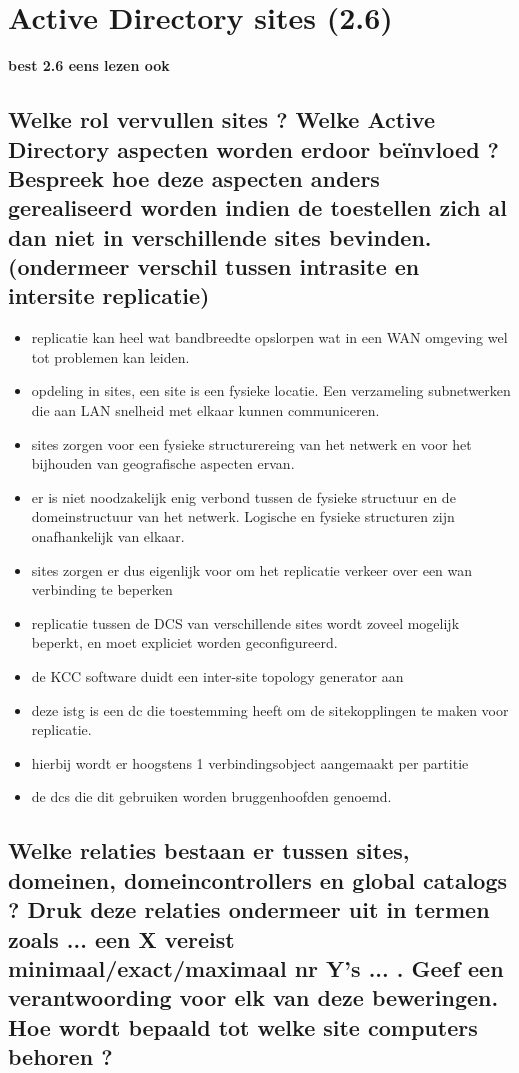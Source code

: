\chapter{ Active Directory sites (2.6)}
\textbf{best 2.6 eens lezen ook}

\section{Welke rol vervullen sites ? Welke Active Directory aspecten worden erdoor be\"invloed ? Bespreek hoe deze aspecten anders gerealiseerd worden indien de toestellen zich al dan niet in verschillende sites bevinden. (ondermeer verschil tussen intrasite en intersite replicatie)}
\begin{itemize}
\item replicatie kan heel wat bandbreedte opslorpen wat in een WAN omgeving wel tot problemen kan leiden.
\item opdeling in sites, een site is een fysieke locatie. Een verzameling subnetwerken die aan LAN snelheid met elkaar kunnen communiceren.
\item sites zorgen voor een fysieke structurereing van het netwerk en voor het bijhouden van geografische aspecten ervan.
\item er is niet noodzakelijk enig verbond tussen de fysieke structuur en de domeinstructuur van het netwerk. Logische en fysieke structuren zijn onafhankelijk van elkaar.
\item sites zorgen er dus eigenlijk voor om het replicatie verkeer over een wan verbinding te beperken
\item replicatie tussen de DCS van verschillende sites wordt zoveel mogelijk beperkt, en moet expliciet worden geconfigureerd.
\item de KCC software duidt een inter-site topology generator aan
\item deze istg is een dc die toestemming heeft om de sitekopplingen te maken voor replicatie.
\item hierbij wordt er hoogstens 1 verbindingsobject aangemaakt  per partitie
\item de dcs die dit gebruiken worden bruggenhoofden genoemd.
\end{itemize}

\section{Welke relaties bestaan er tussen sites, domeinen, domeincontrollers en global catalogs ? Druk deze relaties ondermeer uit in termen zoals ... een X vereist minimaal/exact/maximaal nr Y's ... . Geef een verantwoording voor elk van deze beweringen. Hoe wordt bepaald tot welke site computers behoren ?}

